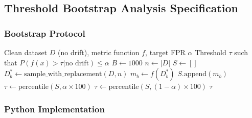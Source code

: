 \subsection{Threshold Bootstrap Analysis Specification}
\label{sec:threshold-bootstrap-impl}

\subsubsection{Bootstrap Protocol}

\begin{algorithm}[H]
\caption{Threshold Bootstrap via Percentile Method}
\label{alg:threshold-bootstrap}
\begin{algorithmic}[1]
\Require Clean dataset $D$ (no drift), metric function $f$, target FPR $\alpha$
\Ensure Threshold $\tau$ such that $P(f(x) > \tau | \text{no drift}) \le \alpha$
\State $B \gets 1000$ 
\State $n \gets |D|$
\State $S \gets []$ 
    \State $D^*_b \gets \text{sample\_with\_replacement}(D, n)$
    \State $m_b \gets f(D^*_b)$ 
    \State $S.\text{append}(m_b)$
\EndFor
{}
    \State $\tau \gets \text{percentile}(S, \alpha \times 100)$ 
\Else
    \State $\tau \gets \text{percentile}(S, (1 - \alpha) \times 100)$ 
\EndIf
\State \Return $\tau$
\end{algorithmic}
\end{algorithm}

\subsubsection{Python Implementation}

